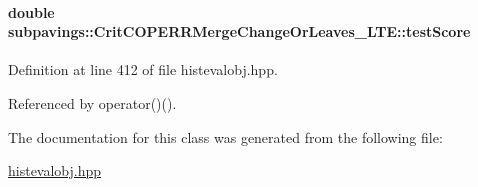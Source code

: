 \hypertarget{classsubpavings_1_1CritCOPERRMergeChangeOrLeaves__LTE_aad06f142352ae025ac483345e29ce06f}{
\paragraph[{test\-Score}]{\setlength{\rightskip}{0pt plus 5cm}double {\bf subpavings\-::\-Crit\-C\-O\-P\-E\-R\-R\-Merge\-Change\-Or\-Leaves\-\_\-\-L\-T\-E\-::test\-Score}}}\label{classsubpavings_1_1CritCOPERRMergeChangeOrLeaves__LTE_aad06f142352ae025ac483345e29ce06f}


\-Definition at line 412 of file histevalobj.\-hpp.



\-Referenced by operator()().



\-The documentation for this class was generated from the following file\-:\begin{DoxyCompactItemize}
\item 
\hyperlink{histevalobj_8hpp}{histevalobj.\-hpp}\end{DoxyCompactItemize}
